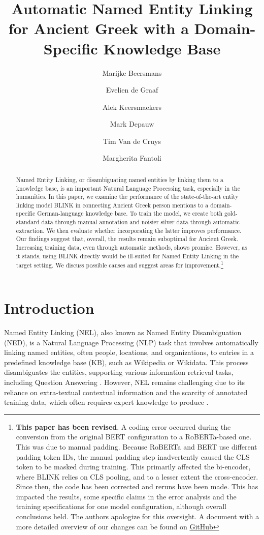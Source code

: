 \documentclass[final]{anthology-ch}
\title{Automatic Named Entity Linking for Ancient Greek with a Domain-Specific Knowledge Base}
\author[1]{Marijke Beersmans}[
orcid=0009-0002-0826-7319
]
\author[1]{Evelien de Graaf}[
orcid=0009-0006-8650-1595
]
\author[1]{Alek Keersmaekers}[
orcid=0000-0003-4403-1143
]
\author[1]{Mark Depauw}[
orcid=0000-0003-0460-3987
]
\author[1]{Tim Van de Cruys}[
orcid=0000-0002-4650-0444
]
\author[1]{Margherita Fantoli}[
orcid=0000-0003-3191-4860
]
\affiliation{1}{Faculty of Arts, KU Leuven, Leuven, Belgium}
\begin{document}
\maketitle

\begin{abstract}
Named Entity Linking, or disambiguating named entities by linking them to a knowledge base, is an important Natural Language Processing task, especially in the humanities. In this paper, we examine the performance of the state-of-the-art entity linking model BLINK in connecting Ancient Greek person mentions to a domain-specific German-language knowledge base. To train the model, we create both gold-standard data through manual annotation and noisier silver data through automatic extraction. We then evaluate whether incorporating the latter improves performance. Our findings suggest that, overall, the results remain suboptimal for Ancient Greek. Increasing training data, even through automatic methods, shows promise. However, as it stands, using BLINK directly would be ill-suited for Named Entity Linking in the target setting. We discuss possible causes and suggest areas for improvement.\footnote{\textbf{This paper has been revised}. A coding error occurred during the conversion from the original BERT configuration to a RoBERTa-based one. This was due to manual padding. Because RoBERTa and BERT use different padding token IDs, the manual padding step inadvertently caused the CLS token to be masked during training. This primarily affected the bi-encoder, where BLINK relies on CLS pooling, and to a lesser extent the cross-encoder. 
Since then, the code has been corrected and reruns have been made. This has impacted the results, some specific claims in the error analysis and the training specifications for one model configuration, although overall conclusions held. The authors apologize for this oversight. A document with a more detailed overview of our changes can be found on \href{https://github.com/MarijkeBeersmans/CHR_code_Greek_NEL.git}{GitHub}
}
\end{abstract}

\section{Introduction}\label{introduction}

Named Entity Linking (NEL), also known as Named Entity Disambiguation (NED), is a Natural Language Processing (NLP) task that involves automatically linking named entities, often people, locations, and organizations, to entries in a predefined knowledge base (KB), such as Wikipedia or Wikidata. This process disambiguates the entities, supporting various information retrieval tasks, including Question Answering \cite{Shen_Wang_Han_2015}. However, NEL remains challenging due to its reliance on extra-textual contextual information and the scarcity of annotated training data, which often requires expert knowledge to produce \cite{vollmers-etal-2025-contextual}.
\end{document}
